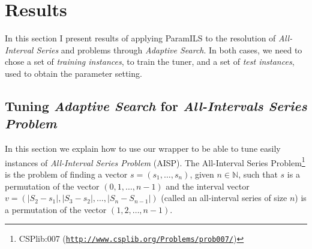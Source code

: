 %
%
%
%
%
%
%

\section{Results}

In this section I present results of applying {\sc ParamILS} to the resolution of {\it All-Interval Series} and \carr{} problems through {\it Adaptive Search}. In both cases, we need to chose a set of {\it training instances}, to train the tuner, and a set of {\it test instances}, used to obtain the parameter setting. 

\subsection{ Tuning {\it Adaptive Search} for  {\it All-Intervals Series Problem}}

In this section we explain how to use our wrapper to be able to tune easily instances of {\it All-Interval Series Problem} (AISP). The All-Interval Series Problem\footnote{CSPlib:007 (\href{http://www.csplib.org/Problems/prob007/}{\texttt{http://www.csplib.org/Problems/prob007/}})} is the problem of finding a vector $s=\left(s_1,\dots,s_n\right)$, given $n \in \mathbb{N}$, such that $s$ is a permutation of the vector $(0, 1, \dots, n-1)$ and the interval vector $v = \left(\left|S_2-s_1\right|, \left|S_3-s_2\right|, \dots, \left|S_n-S_{n-1}\right|\right)$ (called an all-interval series of size $n$) is a permutation of the vector $(1, 2, \dots, n-1)$. 

